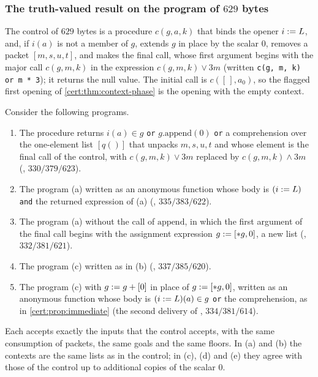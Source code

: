 \subsubsection*{The truth-valued result on the program of $629$ bytes}

The control of $629$ bytes is a procedure $c(g,a,k)$ that binds the opener
$i\mathrel{:=} L$, and, if $i(a)$ is not a member of $g$, extends $g$ in place by the
scalar $0$, removes a packet $[m,s,u,t]$, and makes the final call, whose first
argument begins with the major call $c(g,m,k)$ in the expression
$c(g,m,k)\lor 3m$ (written \texttt{c(g, m, k) or m * 3}); it returns the null
value. The initial call is $c([\,],a_0)$, so the flagged first opening of
\cref{cert:thm:context-phase} is the opening with the empty context.

\begin{proposition}\label{cert:prop:native-append}
Consider the following programs.
\begin{enumerate}[label=(\alph*)]
\item The procedure returns $i(a)\in g$ \texttt{or} $g.\mathrm{append}(0)$
\texttt{or} a comprehension over the one-element list $[q()]$ that unpacks
$m,s,u,t$ and whose element is the final call of the control, with
$c(g,m,k)\lor 3m$ replaced by $c(g,m,k)\land 3m$ (,
$330/379/623$).
\item The program (a) written as an anonymous function whose body is
$(i\mathrel{:=} L)$ \texttt{and} the returned expression of (a)
(, $335/383/622$).
\item The program (a) without the call of $\mathrm{append}$, in which the first
argument of the final call begins with the assignment expression
$g\mathrel{:=}[{*}g,0]$, a new list (, $332/381/621$).
\item The program (c) written as in (b) (, $337/385/620$).
\item The program (c) with $g\mathrel{:=} g+[0]$ in place of $g\mathrel{:=}[{*}g,0]$,
written as an anonymous function whose body is $(i\mathrel{:=} L)(a)\in g$
\texttt{or} the comprehension, as in \cref{cert:prop:immediate} (the second
delivery of , $334/381/614$).
\end{enumerate}
Each accepts exactly the inputs that the control accepts, with the same
consumption of packets, the same goals and the same floors. In (a) and (b) the
contexts are the same lists as in the control; in (c), (d) and (e) they agree
with those of the control up to additional copies of the scalar $0$.
\end{proposition}
